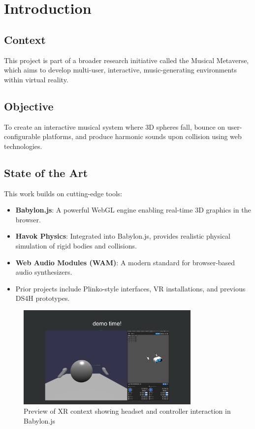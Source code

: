 \documentclass[a4paper,11pt]{article}
\begin{document}
\tableofcontents
\newpage

\section{Introduction}
\subsection{Context}
This project is part of a broader research initiative called the Musical Metaverse, which aims to develop multi-user, interactive, music-generating environments within virtual reality.

\subsection{Objective}
To create an interactive musical system where 3D spheres fall, bounce on user-configurable platforms, and produce harmonic sounds upon collision using web technologies.

\subsection{State of the Art}
This work builds on cutting-edge tools:
\begin{itemize}
    \item \textbf{Babylon.js}: A powerful WebGL engine enabling real-time 3D graphics in the browser.
    \item \textbf{Havok Physics}: Integrated into Babylon.js, provides realistic physical simulation of rigid bodies and collisions.
    \item \textbf{Web Audio Modules (WAM)}: A modern standard for browser-based audio synthesizers.
    \item Prior projects include Plinko-style interfaces, VR installations, and previous DS4H prototypes.
\end{itemize}

\begin{figure}[h!]
    \centering
    \includegraphics[width=0.8\textwidth]{stateXR.jpeg}
    \caption{Preview of XR context showing headset and controller interaction in Babylon.js}
\end{figure}
\newpage
\end{document}
